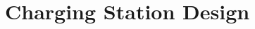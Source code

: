 \section{Charging Station Design}


\begin{figure}[h]
  \centering
  \begin{tikzpicture}
  \end{tikzpicture}
\end{figure}


